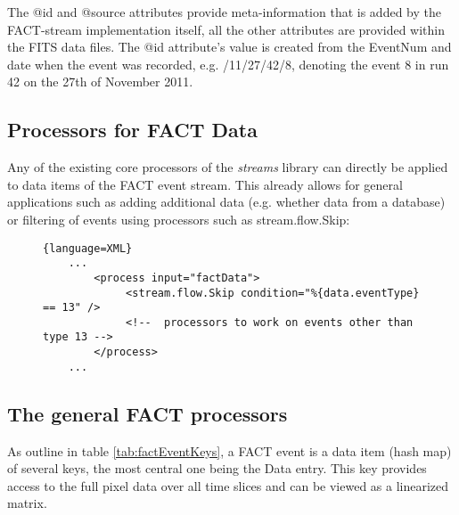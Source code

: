 \documentclass[german,a4,11pt]{scrartcl}
\begin{document}
The {\ttfamily @id} and {\ttfamily @source} attributes provide
meta-information that is added by the FACT-stream implementation
itself, all the other attributes are provided within the FITS data
files. The {\ttfamily @id} attribute's value is created from the
{\ttfamily EventNum} and date when the event was recorded,
e.g. {/11/27/42/8}, denoting the event 8 in run 42 on
the 27th of November 2011.


\subsection{Processors for FACT Data}
Any of the existing core processors of the {\em streams} library can
directly be applied to data items of the FACT event stream. This
already allows for general applications such as adding additional data
(e.g. whether data from a database) or filtering of events using
processors such as {\ttfamily stream.flow.Skip}:
\begin{figure}[h!]
\begin{lstlisting}{language=XML}
    ...
        <process input="factData">
             <stream.flow.Skip condition="%{data.eventType} == 13" />
             <!--  processors to work on events other than type 13 -->
        </process>
    ...
\end{lstlisting}
\end{figure}

\subsection{The general FACT processors}
As outline in table \ref{tab:factEventKeys}, a FACT event is a data item (hash map)
of several keys, the most central one being the {\ttfamily Data} entry. This key
provides access to the full pixel data over all time slices and can be viewed as
a linearized matrix.



\end{document}

